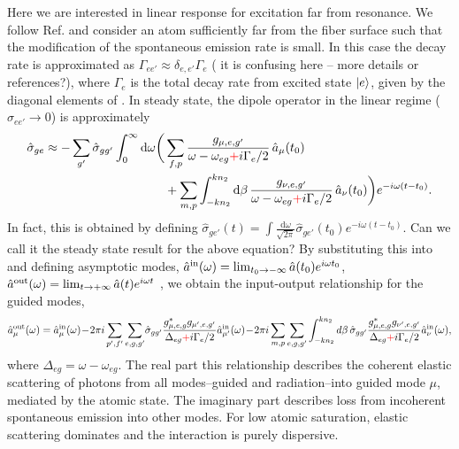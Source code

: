 \documentclass[preprint,aps,pra,onecolumn]{revtex4-1} %
\newcommand{\inp}{{\rm in}}
\newcommand{\out}{{\rm out}}
\newcommand{\comment}[1]{{\color{Maroon} #1}}
\newcommand{\error}[1]{{\color{red} #1}}
\begin{document}
Here we are interested in linear response for excitation far from resonance.  We follow Ref. \cite{le_kien_propagation_2014} and consider an atom sufficiently far from the fiber surface such that the modification of the spontaneous emission rate is small.   In this case the decay rate is approximated as $\Gamma_{ee'} \approx \delta_{e,e'} \Gamma_{e}$ (\comment{it is confusing here -- more details or references?}), where $\Gamma_e$ is the total decay rate from excited state $\lvert{e}\rangle$, given by the diagonal elements of .  In steady state, the dipole operator in the linear regime ($\hat{\sigma}_{ee'} \rightarrow 0 $) is approximately
	\begin{align}
		\hat{\sigma}_{ge} \approx -\sum_{g'} \hat{\sigma}_{gg'}\int_0^{\infty}\mathrm{d}\omega \bigg( & \sum_{f,p}  
\frac{g_{\mu, e,g'}}{\omega-\omega_{eg} \error{+} i \Gamma_{e}/2  }\, \hat{a}_\mu (t_0) \\
	&+\sum_{m,p} \int_{-kn_2}^{kn_2}\mathrm{d}\beta \, \frac{g_{\nu, e,g'}}{\omega-\omega_{eg} \error{+} i \Gamma_{e}/2 } \,\hat{a}_\nu (t_0)  \bigg)e^{-i\omega (t-t_0)} . \nn
	\end{align}
\comment{In fact, this is obtained by defining $ \hat{\sigma}_{ge'}(t)=\int \frac{\mathrm{d}\omega}{\sqrt{2\pi}}\hat{\sigma}_{ge'}(t_0)e^{-i\omega(t-t_0)} $. Can we call it the steady state result for the above equation?}
By substituting this into  and defining asymptotic modes, \comment{ $\hat{a}^{\inp}(\omega) = \lim_{t_0\rightarrow -\infty} \hat{a}(t_0) e^{i\omega t_0}$, $\hat{a}^{\out}(\omega) = \lim_{t\rightarrow +\infty} \hat{a}(t) e^{i\omega t}$ \cite{fan_input-output_2010}}, we obtain the input-output relationship for the guided modes,
	\begin{equation} \label{Eq::aout}
		\hat{a}^{\out}_\mu (\omega) = \hat{a}^{\inp}_\mu (\omega) \!-\! 2\pi i\sum_{p',f'} 
\sum_{e,g,g'}\!\hat{\sigma}_{gg'}\frac{ g_{\mu,e,g}^* g_{\mu',e,g'}}{ \Delta_{eg} \error{+} i \Gamma_{e}/2 }\hat{a}^{\inp}_{\mu'}(\omega) \!-\! 2\pi i\sum_{m,p} \sum_{e,g,g'} \int^{kn_2}_{-kn_2} d\beta \,\hat{\sigma}_{gg'}\frac{ g_{\mu,e,g}^* g_{\nu',e,g'}}{ \Delta_{eg} \error{+} i \Gamma_{e}/2 }\hat{a}^{\inp}_{\nu}(\omega),
	\end{equation}
where $\Delta_{eg} = \omega - \omega_{eg}$.  The real part this relationship describes the coherent elastic scattering of photons from all modes--guided and radiation--into guided mode $\mu$, mediated by the atomic state.  The imaginary part describes loss from incoherent spontaneous emission into other modes.  For low atomic saturation, elastic scattering dominates and the interaction is purely dispersive. 
\end{document}
